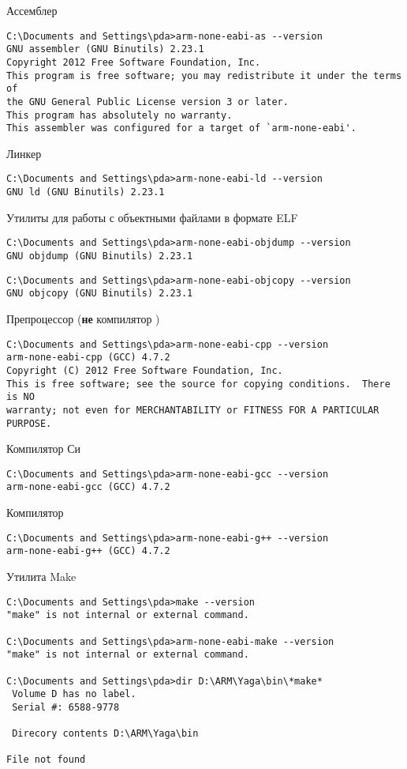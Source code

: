 \bigskip Ассемблер
\begin{lstlisting}[style=con]
C:\Documents and Settings\pda>arm-none-eabi-as --version
GNU assembler (GNU Binutils) 2.23.1
Copyright 2012 Free Software Foundation, Inc.
This program is free software; you may redistribute it under the terms of
the GNU General Public License version 3 or later.
This program has absolutely no warranty.
This assembler was configured for a target of `arm-none-eabi'. 
\end{lstlisting}
\bigskip Линкер
\begin{lstlisting}[style=con]
C:\Documents and Settings\pda>arm-none-eabi-ld --version
GNU ld (GNU Binutils) 2.23.1
\end{lstlisting}
\bigskip Утилиты для работы с объектными файлами в формате ELF
\begin{lstlisting}[style=con]
C:\Documents and Settings\pda>arm-none-eabi-objdump --version
GNU objdump (GNU Binutils) 2.23.1
\end{lstlisting}
\begin{lstlisting}[style=con]
C:\Documents and Settings\pda>arm-none-eabi-objcopy --version
GNU objcopy (GNU Binutils) 2.23.1
\end{lstlisting}
\bigskip Препроцессор (\textbf{не} компилятор \cpp)
\begin{lstlisting}[style=con]
C:\Documents and Settings\pda>arm-none-eabi-cpp --version
arm-none-eabi-cpp (GCC) 4.7.2
Copyright (C) 2012 Free Software Foundation, Inc.
This is free software; see the source for copying conditions.  There is NO
warranty; not even for MERCHANTABILITY or FITNESS FOR A PARTICULAR PURPOSE.
\end{lstlisting}
\bigskip Компилятор Си
\begin{lstlisting}[style=con]
C:\Documents and Settings\pda>arm-none-eabi-gcc --version
arm-none-eabi-gcc (GCC) 4.7.2
\end{lstlisting}
\bigskip Компилятор \cpp
\begin{lstlisting}[style=con]
C:\Documents and Settings\pda>arm-none-eabi-g++ --version
arm-none-eabi-g++ (GCC) 4.7.2
\end{lstlisting}

\bigskip Утилита Make
\begin{lstlisting}[style=con]
C:\Documents and Settings\pda>make --version
"make" is not internal or external command.

C:\Documents and Settings\pda>arm-none-eabi-make --version
"make" is not internal or external command.

C:\Documents and Settings\pda>dir D:\ARM\Yaga\bin\*make*
 Volume D has no label.
 Serial #: 6588-9778

 Direcory contents D:\ARM\Yaga\bin

File not found
\end{lstlisting}

